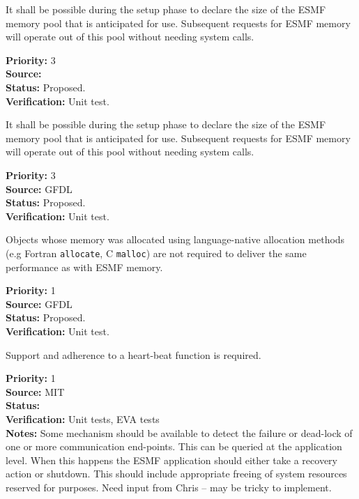 It shall be possible during the setup phase to declare the size of the
ESMF memory pool that is anticipated for use. Subsequent requests for
ESMF memory will operate out of this pool without needing system
calls.
\begin{reqlist}
{\bf Priority:} 3 \\
{\bf Source:}  \\
{\bf Status:} Proposed. \\
{\bf Verification:} Unit test. \\ 
\end{reqlist}


It shall be possible during the setup phase to declare the size of the
ESMF memory pool that is anticipated for use. Subsequent requests for
ESMF memory will operate out of this pool without needing system
calls.
\begin{reqlist}
{\bf Priority:} 3 \\
{\bf Source:} GFDL \\
{\bf Status:} Proposed. \\
{\bf Verification:} Unit test. \\ 
\end{reqlist}

Objects whose memory was allocated using language-native allocation
methods (e.g Fortran \texttt{allocate}, C \texttt{malloc}) are not
required to deliver the same performance as with ESMF memory.
\begin{reqlist}
{\bf Priority:} 1 \\
{\bf Source:} GFDL \\
{\bf Status:} Proposed. \\
{\bf Verification:} Unit test. \\ 
\end{reqlist}


Support and adherence to a heart-beat function is required.

\begin{reqlist}
  {\bf Priority:} 1 \\
  {\bf Source:}  MIT \\
  {\bf Status:}  \\
  {\bf Verification:} Unit tests, EVA tests \\
  {\bf Notes:} Some mechanism should be available to detect the
  failure or dead-lock of one or more communication end-points. This
  can be queried at the application level. When this happens the ESMF
  application should either take a recovery action or shutdown. 
  This should include appropriate freeing of system resources 
  reserved for {\bf \shortname} purposes.
  Need input from Chris -- may be tricky to implement. 
\end{reqlist}


